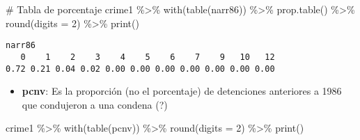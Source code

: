 \documentclass[
  letterpaper,
  DIV=11,
  numbers=noendperiod]{scrreprt}
\newenvironment{Shaded}{\begin{snugshade}}{\end{snugshade}}
\newcommand{\AttributeTok}[1]{\textcolor[rgb]{0.40,0.45,0.13}{#1}}
\newcommand{\CommentTok}[1]{\textcolor[rgb]{0.37,0.37,0.37}{#1}}
\newcommand{\DecValTok}[1]{\textcolor[rgb]{0.68,0.00,0.00}{#1}}
\newcommand{\FunctionTok}[1]{\textcolor[rgb]{0.28,0.35,0.67}{#1}}
\newcommand{\NormalTok}[1]{\textcolor[rgb]{0.00,0.23,0.31}{#1}}
\newcommand{\SpecialCharTok}[1]{\textcolor[rgb]{0.37,0.37,0.37}{#1}}
\providecommand{\tightlist}{%
  \setlength{\itemsep}{0pt}\setlength{\parskip}{0pt}}\usepackage{longtable,booktabs,array}
\begin{document}
\begin{Shaded}
\begin{Highlighting}[]
\CommentTok{\# Tabla de porcentaje}
\NormalTok{crime1 }\SpecialCharTok{\%\textgreater{}\%} 
  \FunctionTok{with}\NormalTok{(}\FunctionTok{table}\NormalTok{(narr86)) }\SpecialCharTok{\%\textgreater{}\%} 
  \FunctionTok{prop.table}\NormalTok{() }\SpecialCharTok{\%\textgreater{}\%} 
  \FunctionTok{round}\NormalTok{(}\AttributeTok{digits =} \DecValTok{2}\NormalTok{) }\SpecialCharTok{\%\textgreater{}\%} 
  \FunctionTok{print}\NormalTok{()}
\end{Highlighting}
\end{Shaded}

\begin{verbatim}
narr86
   0    1    2    3    4    5    6    7    9   10   12 
0.72 0.21 0.04 0.02 0.00 0.00 0.00 0.00 0.00 0.00 0.00 
\end{verbatim}

\begin{itemize}
\tightlist
\item
  \textbf{pcnv}: Es la proporción (no el porcentaje) de detenciones
  anteriores a 1986 que condujeron a una condena (?)
\end{itemize}

\begin{Shaded}
\begin{Highlighting}[]
\NormalTok{crime1 }\SpecialCharTok{\%\textgreater{}\%} 
  \FunctionTok{with}\NormalTok{(}\FunctionTok{table}\NormalTok{(pcnv)) }\SpecialCharTok{\%\textgreater{}\%} 
  \FunctionTok{round}\NormalTok{(}\AttributeTok{digits =} \DecValTok{2}\NormalTok{) }\SpecialCharTok{\%\textgreater{}\%} 
  \FunctionTok{print}\NormalTok{()}
\end{Highlighting}
\end{Shaded}
\end{document}

